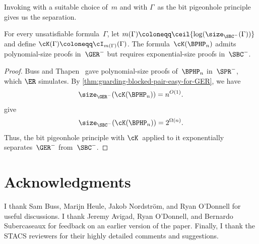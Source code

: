 \documentclass[10pt,a4paper]{article}
\begin{document}
Invoking  with a suitable choice of~$m$
and with $\Gamma$~as the bit pigeonhole principle gives us the separation.

\begin{theorem}\label{thm:separation-GER-from-SBC}
  For every unsatisfiable formula~$\Gamma$,
  let $m(\Gamma) \coloneqq \ceil{\log(\size_{\SBC^-}(\Gamma))}$
  and define $\cK(\Gamma) \coloneqq \cI_{m(\Gamma)}(\Gamma)$.
  The formula~$\cK(\BPHP_n)$ admits polynomial-size proofs in~$\GER^-$
  but requires exponential-size proofs in~$\SBC^-$.
\end{theorem}
\begin{proof}
  Buss and Thapen~\cite[Theorem~4.4]{BT21}
  gave polynomial-size proofs of~$\BPHP_n$
  in~$\SPR^-$, which $\ER$ simulates.
  By \cref{thm:guarding-blocked-pair-easy-for-GER}, we have
  \begin{equation*}
    \size_{\GER^-}(\cK(\BPHP_n)) = n^{O(1)}.
  \end{equation*}
   give
  \begin{equation*}
    \size_{\SBC^-}(\cK(\BPHP_n)) = 2^{\Omega(n)}.
  \end{equation*}
  Thus, the bit pigeonhole principle with $\cK$~applied to it
  exponentially separates~$\GER^-$ from~$\SBC^-$.
\end{proof}

\section*{Acknowledgments}
\label{sec:acknowledgments}

I thank Sam Buss, Marijn Heule, Jakob Nordström, and Ryan O'Donnell
for useful discussions.
I thank Jeremy Avigad, Ryan O'Donnell, and Bernardo Subercaseaux
for feedback on an earlier version of the paper.
Finally, I thank the STACS reviewers
for their highly detailed comments and suggestions.
\end{document}
